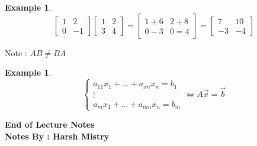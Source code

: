 \documentclass{article}
\newtheorem{ex}[theorem]{Example}
\begin{document}
\begin{ex}
\[\begin{bmatrix} 1 & 2 \\ 0 & -1 \end{bmatrix} \begin{bmatrix} 1 & 2 \\ 3 & 4 \end{bmatrix} = \begin{bmatrix} 1 + 6 & 2+8 \\ 0 - 3 & 0 = 4 \end{bmatrix} = \begin{bmatrix} 7 & 10 \\ -3 & -4 \end{bmatrix} \]
\end{ex}

Note : \( AB \neq BA\)

\begin{ex}
\[\begin{cases} a_{11}x_1 + \ldots + a_{xn} x_n = b_1 \\ \vdots \\ a_m x_1 + \ldots + a_{mn}x_n = b_m \end{cases} \iff A\vec{x} = \vec{b} \] 
\end{ex}

\begin{center}
\textbf{End of Lecture Notes} \\
\textbf{Notes By : Harsh Mistry}
\end{center}
\end{document}
